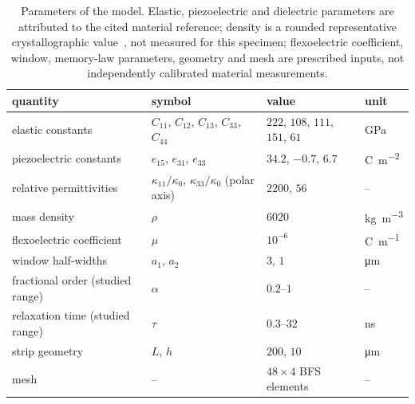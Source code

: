 \begin{table}[!t]
\centering
\small
\caption{Parameters of the model. Elastic, piezoelectric and dielectric parameters are attributed to
the cited material reference; density is a rounded representative
crystallographic value~\cite{Nakatani2016}, not measured for this specimen;
flexoelectric coefficient, window, memory-law parameters, geometry and mesh
are prescribed inputs, not independently calibrated material measurements.}
\label{tab:params}
\begin{tabular}{@{}llll@{}}
\toprule
quantity & symbol & value & unit \\
\midrule
elastic constants & $C_{11}$, $C_{12}$, $C_{13}$, $C_{33}$, $C_{44}$ &
$222$, $108$, $111$, $151$, $61$ & GPa \\
piezoelectric constants & $e_{15}$, $e_{31}$, $e_{33}$ &
$34.2$, $-0.7$, $6.7$ & \si{\coulomb\per\square\meter} \\
relative permittivities & $\kappa_{11}/\kappa_0$, $\kappa_{33}/\kappa_0$
(polar axis) &
$2200$, $56$ & -- \\
mass density & $\rho$ & $6020$ & \si{\kilo\gram\per\cubic\meter} \\
\midrule
flexoelectric coefficient & $\mu$ & $10^{-6}$ & \si{\coulomb\per\meter} \\
window half-widths & $a_1$, $a_2$ & $3$, $1$ & \si{\micro\meter} \\
fractional order (studied range) & $\alpha$ & $0.2$--$1$ & -- \\
relaxation time (studied range) & $\tau$ & $0.3$--$32$ & \si{\nano\second} \\
strip geometry & $L$, $h$ & $200$, $10$ & \si{\micro\meter} \\
mesh & -- & $48\times4$ BFS elements & -- \\
\bottomrule
\end{tabular}
\end{table}
